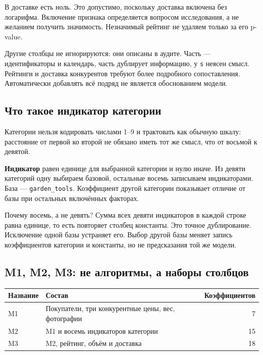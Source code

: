 \documentclass[12pt,a4paper]{article}
\begin{document}
В доставке есть ноль. Это допустимо, поскольку доставка включена без логарифма. Включение признака определяется вопросом исследования, а не желанием получить значимость. Незначимый рейтинг не удаляем только за его p-value.

Другие столбцы не игнорируются: они описаны в аудите. Часть --- идентификаторы и календарь, часть дублирует информацию, у \texttt{s} неясен смысл. Рейтинги и доставка конкурентов требуют более подробного сопоставления. Автоматически добавлять всё подряд не является обоснованием модели.

\subsection{Что такое индикатор категории}

Категории нельзя кодировать числами 1--9 и трактовать как обычную шкалу: расстояние от первой ко второй не обязано иметь тот же смысл, что от восьмой к девятой.

\textbf{Индикатор} равен единице для выбранной категории и нулю иначе. Из девяти категорий одну выбираем базовой, остальные восемь записываем индикаторами. База --- \texttt{garden\_tools}. Коэффициент другой категории показывает отличие от базы при остальных включённых факторах.

Почему восемь, а не девять? Сумма всех девяти индикаторов в каждой строке равна единице, то есть повторяет столбец константы. Это точное дублирование. Исключение одной базы устраняет его. Выбор другой базы меняет запись коэффициентов категории и константы, но не предсказания той же модели.

\subsection{M1, M2, M3: не алгоритмы, а наборы столбцов}

\begin{center}\small
\begin{tabular}{lp{}r}
\toprule Название & Состав & Коэффициентов\\\midrule
M1 & Покупатели, три конкурентные цены, вес, фотографии & 7\\
M2 & M1 и восемь индикаторов категории & 15\\
M3 & M2, рейтинг, объём и доставка & 18\\
\bottomrule\end{tabular}\end{center}
\end{document}
